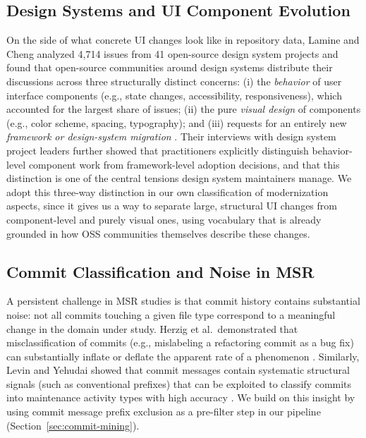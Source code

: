 \documentclass{article}
\begin{document}
\subsection{Design Systems and UI Component Evolution}
On the side of what concrete UI changes look like in repository data,
Lamine and Cheng analyzed 4,714 issues from 41 open-source design system
projects and found that open-source communities around design systems
distribute their discussions across three structurally distinct concerns:
(i) the \emph{behavior} of user interface components (e.g., state changes,
accessibility, responsiveness), which accounted for the largest share of
issues; (ii) the pure \emph{visual design} of components (e.g., color
scheme, spacing, typography); and (iii) requests for an entirely new
\emph{framework or design-system migration} \cite{lamine2022understanding}.
Their interviews with design system project leaders further showed that
practitioners explicitly distinguish behavior-level component work from
framework-level adoption decisions, and that this distinction is one of
the central tensions design system maintainers manage. We adopt this
three-way distinction in our own classification of modernization aspects,
since it gives us a way to separate large, structural UI changes from
component-level and purely visual ones, using vocabulary that is already
grounded in how OSS communities themselves describe these changes.

\subsection{Commit Classification and Noise in MSR}
A persistent challenge in MSR studies is that commit history contains
substantial noise: not all commits touching a given file type correspond
to a meaningful change in the domain under study. Herzig et al.\
demonstrated that misclassification of commits (e.g., mislabeling a
refactoring commit as a bug fix) can substantially inflate or deflate
the apparent rate of a phenomenon \cite{herzig2013}. Similarly, Levin
and Yehudai showed that commit messages contain systematic structural
signals (such as conventional prefixes) that can be exploited to
classify commits into maintenance activity types with high accuracy
\cite{levin2017}. We build on this insight by using commit message
prefix exclusion as a pre-filter step in our pipeline
(Section~\ref{sec:commit-mining}).
\end{document}
